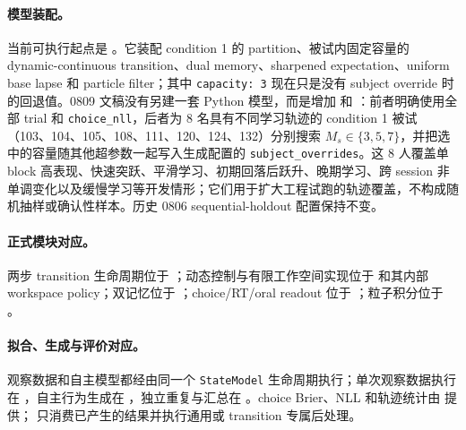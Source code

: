 \paragraph{模型装配。}
当前可执行起点是
。它装配 condition 1 的 partition、被试内固定容量的 dynamic-continuous transition、dual memory、sharpened expectation、uniform base lapse 和 particle filter；其中 \texttt{capacity: 3} 现在只是没有 subject override 时的回退值。0809 文稿没有另建一套 Python 模型，而是增加
和
：前者明确使用全部 trial 和 \texttt{choice\_nll}，后者为 8 名具有不同学习轨迹的 condition 1 被试（103、104、105、108、111、120、124、132）分别搜索 $M_s\in\{3,5,7\}$，并把选中的容量随其他超参数一起写入生成配置的 \texttt{subject\_overrides}。这 8 人覆盖单 block 高表现、快速突跃、平滑学习、初期回落后跃升、晚期学习、跨 session 非单调变化以及缓慢学习等开发情形；它们用于扩大工程试跑的轨迹覆盖，不构成随机抽样或确认性样本。历史 0806 sequential-holdout 配置保持不变。

\paragraph{正式模块对应。}
两步 transition 生命周期位于
；动态控制与有限工作空间实现位于
和其内部 workspace policy；双记忆位于
；choice/RT/oral readout 位于
；粒子积分位于
。

\paragraph{拟合、生成与评价对应。}
观察数据和自主模型都经由同一个 \texttt{StateModel} 生命周期执行；单次观察数据执行在
，自主行为生成在
，独立重复与汇总在
。choice Brier、NLL 和轨迹统计由
 提供；
 只消费已产生的结果并执行通用或 transition 专属后处理。

